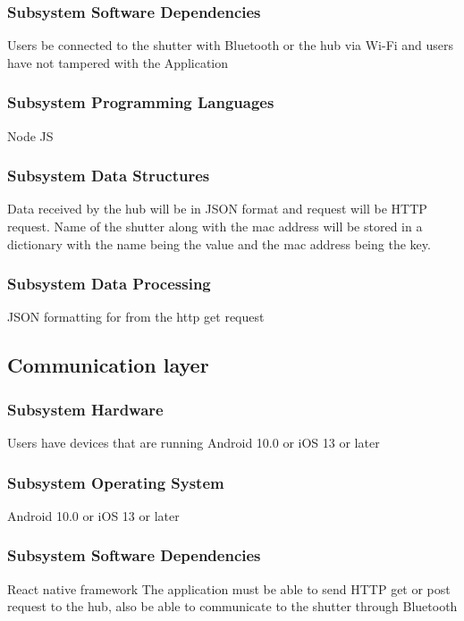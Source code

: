 \subsubsection{Subsystem Software Dependencies}
Users be connected to the shutter with Bluetooth or the hub via Wi-Fi and users have not tampered with the Application 

\subsubsection{Subsystem Programming Languages}
Node JS


\subsubsection{Subsystem Data Structures}
Data received by the hub will be in JSON format and request will be HTTP request. Name of the shutter along with the mac address will be stored in a dictionary with the name being the value and the mac address being the key.


\subsubsection{Subsystem Data Processing}
JSON formatting for from the http get request

\subsection{Communication layer}

\subsubsection{Subsystem Hardware}
Users have devices that are running Android 10.0 or iOS 13 or later

\subsubsection{Subsystem Operating System}
Android 10.0 or iOS 13 or later

\subsubsection{Subsystem Software Dependencies}
React native framework
The application must be able to send HTTP get or post request to the hub, also be able to communicate to the shutter through Bluetooth 

